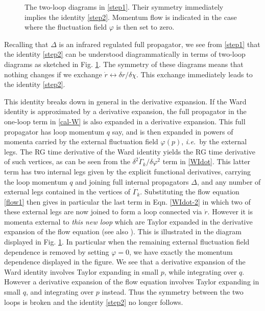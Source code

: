\documentclass[11pt]{book}
\newcommand\ie{\textit{i.e.}\ }
\numberwithin{equation}{chapter}
\begin{document}
\begin{figure}
  \begin{center}
    
  \end{center}
  \caption{
    The two-loop diagrams in \eqref{step1}.
    Their symmetry immediately implies the identity \eqref{step2}.
    Momentum flow is indicated in the case where the fluctuation field $\varphi$ is then set to zero.
  }
  \label{fig:twoloop}
\end{figure}
Recalling that $\Delta$ is an infrared regulated full propagator,
we see from \eqref{step1} that the identity \eqref{step2} can be understood diagrammatically
in terms of two-loop diagrams as sketched in Fig. \ref{fig:twoloop}.
The symmetry of these diagrams means that nothing changes if we
exchange $\dot{r}\leftrightarrow\delta r/\delta\chi$.
This exchange immediately leads to the identity \eqref{step2}.

This identity breaks down in general in the derivative expansion.
If the Ward identity is approximated by a derivative expansion,
the full propagator in the one-loop term in \eqref{cal-W} is also expanded in a derivative expansion.
This full propagator has loop momentum $q$ say,
and is then expanded in powers of momenta carried by the external fluctuation
field $\varphi(p)$, \ie by the external legs.
The RG time derivative of the Ward identity yields the RG time derivative of such vertices,
as can be seen from the $\delta^2\dot{\Gamma}_k/\delta\varphi^2$ term  in \eqref{WIdot}.
This latter term has two internal legs given by the explicit functional derivatives,
carrying the loop momentum $q$ and joining full internal propagators $\Delta$,
and any number of external legs contained in the vertices of $\dot{\Gamma}_k$.
Substituting the flow equation \eqref{flow1} then gives in particular the last term in
Eqn. \eqref{WIdot-2} in which two of these external legs are now joined to form a loop
connected via $\dot{r}$.  However it is momenta external to \emph{this new loop} which are
Taylor expanded in the derivative expansion of the flow equation
(see also \cite{Morris:1999ba, Morris:2000hm}).
This is illustrated in the diagram displayed in Fig. \ref{fig:twoloop}.
In particular when the remaining external fluctuation field dependence is removed by setting $\varphi=0$,
we have exactly the momentum dependence displayed in the figure.
We see that a derivative expansion of the Ward identity involves Taylor expanding in small $p$,
while integrating over $q$.
However a derivative expansion of the flow equation involves Taylor expanding in small $q$,
and integrating over $p$ instead.
Thus the symmetry between the two loops is broken and the identity \eqref{step2} no longer follows.
\end{document}
